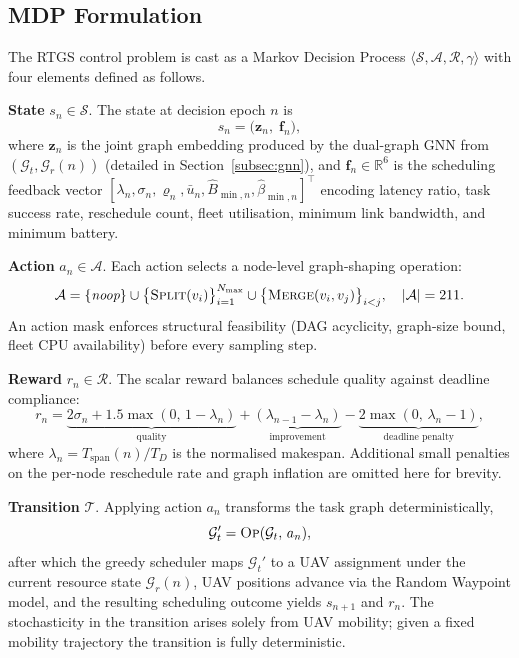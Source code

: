 
\subsection{MDP Formulation}
\label{subsec:mdp}

The RTGS control problem is cast as a Markov Decision Process
$\langle \mathcal{S}, \mathcal{A}, \mathcal{R}, \gamma \rangle$
with four elements defined as follows.

\smallskip
\noindent\textbf{State} $s_n \in \mathcal{S}$.
The state at decision epoch $n$ is
\begin{equation}
  s_n = \bigl(\mathbf{z}_n,\; \mathbf{f}_n\bigr),
  \label{eq:state}
\end{equation}
where $\mathbf{z}_n$ is the joint graph embedding produced by the
dual-graph GNN from $(\mathcal{G}_t, \mathcal{G}_r(n))$
(detailed in Section~\ref{subsec:gnn}), and
$\mathbf{f}_n \in \mathbb{R}^6$ is the scheduling feedback vector
$[\lambda_n, \sigma_n, \varrho_n, \bar{u}_n,
  \hat{B}_{\min,n}, \hat{\beta}_{\min,n}]^\top$
encoding latency ratio, task success rate, reschedule count,
fleet utilisation, minimum link bandwidth, and minimum battery.

\smallskip
\noindent\textbf{Action} $a_n \in \mathcal{A}$.
Each action selects a node-level graph-shaping operation:
\begin{equation}
  \mathcal{A} = \{\textit{noop}\}
    \cup \bigl\{\textsc{Split}(v_i)\bigr\}_{i=1}^{N_{\max}}
    \cup \bigl\{\textsc{Merge}(v_i,v_j)\bigr\}_{i < j},
    \quad |\mathcal{A}| = 211.
  \label{eq:action}
\end{equation}
An action mask enforces structural feasibility
(DAG acyclicity, graph-size bound, fleet CPU availability)
before every sampling step.

\smallskip
\noindent\textbf{Reward} $r_n \in \mathcal{R}$.
The scalar reward balances schedule quality against deadline
compliance:
\begin{equation}
  r_n =
    \underbrace{2\sigma_n + 1.5\max(0,\,1-\lambda_n)}_{\text{quality}}
    + \underbrace{(\lambda_{n-1}-\lambda_n)}_{\text{improvement}}
    - \underbrace{2\max(0,\,\lambda_n-1)}_{\text{deadline penalty}},
  \label{eq:reward}
\end{equation}
where $\lambda_n = T_{\mathrm{span}}(n)/T_D$ is the normalised
makespan.
Additional small penalties on the per-node reschedule rate and
graph inflation are omitted here for brevity.

\smallskip
\noindent\textbf{Transition} $\mathcal{T}$.
Applying action $a_n$ transforms the task graph deterministically,
\begin{equation}
  \mathcal{G}_t' = \textsc{Op}(\mathcal{G}_t,\, a_n),
  \label{eq:transition}
\end{equation}
after which the greedy scheduler maps $\mathcal{G}_t'$ to a UAV
assignment under the current resource state $\mathcal{G}_r(n)$,
UAV positions advance via the Random Waypoint model, and the
resulting scheduling outcome yields $s_{n+1}$ and $r_n$.
The stochasticity in the transition arises solely from UAV
mobility; given a fixed mobility trajectory the transition is
fully deterministic.
